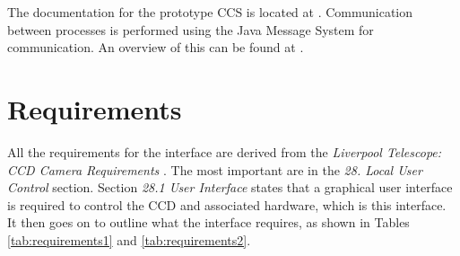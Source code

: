 \documentclass[10pt,a4paper]{article}
\begin{document}
The documentation for the prototype CCS is located at \cite{bib:ccstop}. Communication between processes
is performed using the Java Message System for communication. An overview of this can be found at
\cite{bib:ngatnet}.

\section{Requirements}
All the requirements for the interface are derived from the {\em Liverpool Telescope: CCD
Camera Requirements} \cite{bib:ccdr}. The most important are in the {\em 28. Local User Control} section.
Section {\em 28.1 User Interface} states that a graphical user interface is required to control the
CCD and associated hardware, which is this interface. It then goes on to outline what the interface
requires, as shown in Tables \ref{tab:requirements1} and \ref{tab:requirements2}.
\end{document}
